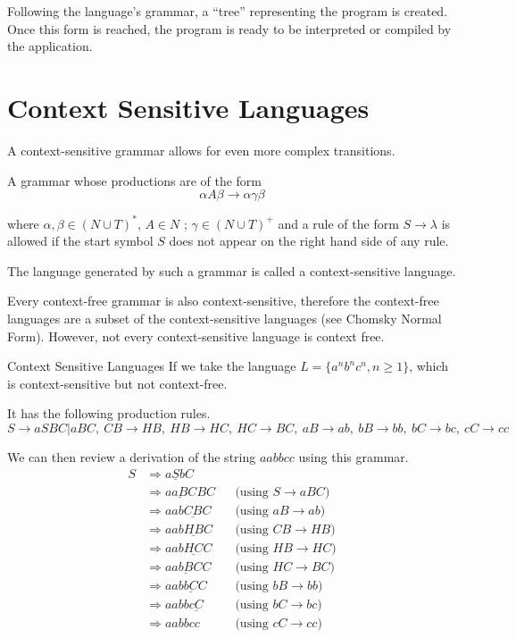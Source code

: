 Following the language's grammar, a ``tree'' representing the program is created. Once this form is reached, the program is ready to be interpreted or compiled by the application.

\section{Context Sensitive Languages}
A context-sensitive grammar allows for even more complex transitions.
\begin{define}
\item[Context-Sensitive Grammar] A grammar whose productions are of the form
\[\alpha A \beta \rightarrow \alpha \gamma \beta\]

where $\alpha, \beta \in (N \cup T)^*$, $A \in N$ ; $\gamma \in (N \cup T)^+$ and a rule of the form $S \rightarrow \lambda$ is allowed if the start symbol $S$ does not appear on the right hand side of any rule.
\end{define}

The language generated by such a grammar is called a context-sensitive language.

Every context-free grammar is also context-sensitive, therefore the context-free languages are a subset of the context-sensitive languages (see Chomsky Normal Form). However, not every context-sensitive language is context free.

\begin{example}{Context Sensitive Languages}
If we take the language $L=\{a^nb^nc^n, n \geq 1\}$, which is context-sensitive but not context-free. 

It has the following production rules.
\[S \rightarrow aSBC | aBC,\ CB \rightarrow HB,\ HB \rightarrow HC,\ HC \rightarrow BC,\ aB \rightarrow ab,\ bB \rightarrow bb,\ bC \rightarrow bc,\ cC \rightarrow cc\]

We can then review a derivation of the string $aabbcc$ using this grammar.
\begin{align*}
S & \Rightarrow a \underline{S}bC && \\
& \Rightarrow a \underline{aB}CBC && \textrm{(using }S \rightarrow aBC \textrm{)}\\
& \Rightarrow aab \underline{CB}C && \textrm{(using }aB \rightarrow ab \textrm{)}\\
& \Rightarrow aab \underline{HB}C && \textrm{(using }CB \rightarrow HB \textrm{)}\\
& \Rightarrow aab \underline{HC}C && \textrm{(using }HB \rightarrow HC \textrm{)}\\
& \Rightarrow aa \underline{bB}CC && \textrm{(using }HC \rightarrow BC \textrm{)}\\
& \Rightarrow aab \underline{bC}C && \textrm{(using }bB \rightarrow bb \textrm{)}\\
& \Rightarrow aabb \underline{cC} && \textrm{(using }bC \rightarrow bc \textrm{)}\\
& \Rightarrow aabbcc && \textrm{(using }cC \rightarrow cc \textrm{)}
\end{align*}
\end{example}

